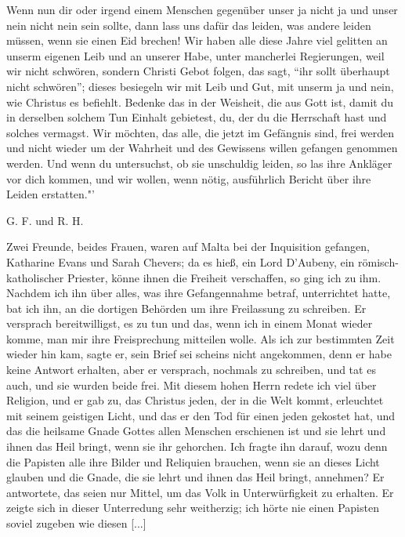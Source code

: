 Wenn nun dir oder irgend einem Menschen gegenüber unser
ja nicht ja und unser nein nicht nein sein sollte, dann lass uns
dafür das leiden, was andere leiden müssen, wenn sie einen Eid
brechen! Wir haben alle diese Jahre viel gelitten an unserm
eigenen Leib und an unserer Habe, unter mancherlei Regierungen,
weil wir nicht schwören, sondern Christi Gebot folgen, das sagt,
"`ihr sollt überhaupt nicht schwören"'; dieses besiegeln wir mit Leib
und Gut, mit unserm ja und nein, wie Christus es befiehlt.
Bedenke das in der Weisheit, die aus Gott ist, damit du in
derselben solchem Tun Einhalt gebietest, du, der du die Herrschaft
hast und solches vermagst. Wir möchten, das alle, die jetzt im
Gefängnis sind, frei werden und nicht wieder um der Wahrheit
und des Gewissens willen gefangen genommen werden. Und wenn
du untersuchst, ob sie unschuldig leiden, so las ihre Ankläger vor
dich kommen, und wir wollen, wenn nötig, ausführlich Bericht
über ihre Leiden erstatten."' 
\begin{flushright}G. F. und R. H.\end{flushright}

Zwei Freunde, beides Frauen, waren auf Malta bei der
Inquisition gefangen, Katharine Evans 
und Sarah Chevers; da
es hieß, ein Lord D'Aubeny, 
ein römisch-katholischer Priester,
könne ihnen die Freiheit verschaffen, so ging ich zu ihm. Nachdem 
ich ihn über alles, was ihre Gefangennahme betraf, unterrichtet 
hatte, bat ich ihn, an die dortigen Behörden um ihre
Freilassung zu schreiben. Er versprach bereitwilligst, es zu tun
und das, wenn ich in einem Monat wieder komme, man mir
ihre Freisprechung mitteilen wolle. Als ich zur bestimmten Zeit
wieder hin kam, sagte er, sein Brief sei scheins nicht angekommen,
denn er habe keine Antwort erhalten, aber er versprach, nochmals
zu schreiben, und tat es auch, und sie wurden beide frei.
Mit diesem hohen Herrn redete ich viel über Religion, und
er gab zu, das Christus jeden, der in die Welt kommt, erleuchtet
mit seinem geistigen Licht, und das er den Tod für einen jeden
gekostet hat, und das die heilsame Gnade Gottes allen Menschen
erschienen ist und sie lehrt und ihnen das Heil bringt, wenn sie
ihr gehorchen. Ich fragte ihn darauf, wozu denn die Papisten
alle ihre Bilder und Reliquien brauchen, wenn sie an dieses Licht
glauben und die Gnade, die sie lehrt und ihnen das Heil bringt,
annehmen? Er antwortete, das seien nur Mittel, um das
Volk in Unterwürfigkeit zu erhalten. Er zeigte sich in dieser
Unterredung sehr weitherzig; ich hörte nie einen Papisten soviel
zugeben wie diesen [...]

